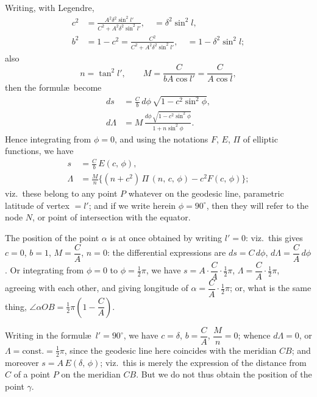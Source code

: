 \documentclass[11pt,a4paper]{article}
\begin{document}
\medskip

Writing, with Legendre,
\begin{align*}
c^2 &= \frac{A^2\delta^2\sin^2 l'}{C^2 + A^2\delta^2\sin^2 l'},
       \quad = \delta^2\sin^2 l, \\
b^2 &= 1 - c^2 = \frac{C^2}{C^2 + A^2\delta^2\sin^2 l'},
       \quad = 1 - \delta^2\sin^2 l;
\end{align*}
also
\[
n = \tan^2 l', \qquad M = \frac{C}{b A\cos l'} = \frac{C}{A\cos l},
\]
then the formul\ae\ become
\begin{align*}
ds      &= \frac{C}{b}\,d\phi\,\sqrt{1 - c^2\sin^2\phi}, \\
d\Lambda &= M\,\frac{d\phi\,\sqrt{1 - c^2\sin^2\phi}}{1 + n\sin^2\phi}.
\end{align*}
Hence integrating from $\phi = 0$, and using the notations $F$, $E$, $\Pi$ of
elliptic functions, we have
\begin{align*}
s       &= \frac{C}{b}\,E(c,\,\phi), \\
\Lambda &= \frac{M}{n}\bigl\{(n + c^2)\,\Pi\,(n,\,c,\,\phi) - c^2 F(c,\,\phi)\bigr\};
\end{align*}
viz.\ these belong to any point $P$ whatever on the geodesic line, parametric
latitude of vertex $= l'$; and if we write herein $\phi = 90^\circ$, then they
will refer to the node $N$, or point of intersection with the equator.

The position of the point $\alpha$ is at once obtained by writing $l' = 0$:
viz.\ this gives $c = 0$, $b = 1$, $M = \dfrac{C}{A}$, $n = 0$: the differential
expressions are $ds = C\,d\phi$, $d\Lambda = \dfrac{C}{A}\,d\phi$.  Or
integrating from $\phi = 0$ to $\phi = \tfrac{1}{2}\pi$, we have
$s = A\cdot\dfrac{C}{A}\cdot\tfrac{1}{2}\pi$,
$\Lambda = \dfrac{C}{A}\cdot\tfrac{1}{2}\pi$, agreeing with each other, and
giving longitude of $\alpha = \dfrac{C}{A}\cdot\tfrac{1}{2}\pi$; or, what is
the same thing, $\angle\alpha OB = \tfrac{1}{2}\pi\left(1 - \dfrac{C}{A}\right)$.

Writing in the formul\ae\ $l' = 90^\circ$, we have $c = \delta$,
$b = \dfrac{C}{A}$, $\dfrac{M}{n} = 0$; whence $d\Lambda = 0$, or
$\Lambda = \text{const.} = \tfrac{1}{2}\pi$, since the geodesic line here
coincides with the meridian $CB$; and moreover $s = A\,E(\delta,\,\phi)$; viz.\
this is merely the expression of the distance from $C$ of a point $P$ on the
meridian $CB$.  But we do not thus obtain the position of the point $\gamma$.
\end{document}
